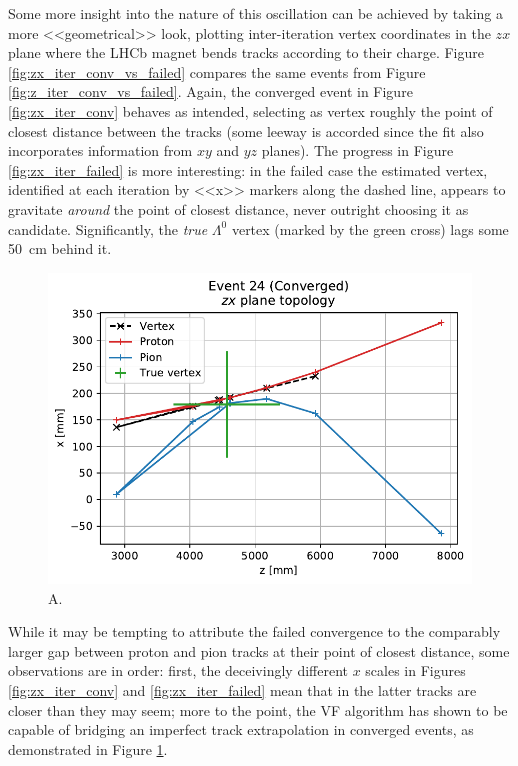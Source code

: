 Some more insight into the nature of this oscillation can be achieved by taking a more <<geometrical>> look, plotting inter-iteration vertex coordinates in the $zx$ plane where the LHCb magnet bends tracks according to their charge.
Figure \ref{fig:zx_iter_conv_vs_failed} compares the same events from Figure \ref{fig:z_iter_conv_vs_failed}.
Again, the converged event in Figure \ref{fig:zx_iter_conv} behaves as intended, selecting as vertex roughly the point of closest distance between the tracks (some leeway is accorded since the fit also incorporates information from $xy$ and $yz$ planes).
The progress in Figure \ref{fig:zx_iter_failed} is more interesting: in the failed case the estimated vertex, identified at each iteration by <<x>> markers along the dashed line, appears to gravitate \textit{around} the point of closest distance, never outright choosing it as candidate.
Significantly, the \textit{true} $\Lambda^0$ vertex (marked by the green cross) lags some \SI{50}{\centi\meter} behind it.

\begin{figure}
	\centering
	\includegraphics[width=.6\textwidth]{graphics/03-vertex_reconstruction/evt_conv_backstep_zx_iter.pdf}
	\caption{A.}
	\label{fig:zx_iter_conv_backstep}
\end{figure}

While it may be tempting to attribute the failed convergence to the comparably larger gap between proton and pion tracks at their point of closest distance, some observations are in order:
first, the deceivingly different $x$ scales in Figures \ref{fig:zx_iter_conv} and \ref{fig:zx_iter_failed} mean that in the latter tracks are closer than they may seem;
more to the point, the VF algorithm has shown to be capable of bridging an imperfect track extrapolation in converged events, as demonstrated in Figure \ref{fig:zx_iter_conv_backstep}.

